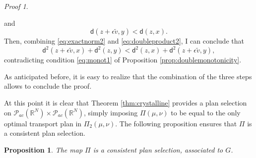 \documentclass[11pt,twoside,a4paper]{article}
\newcommand{\R}{\mathbb{R}}
\newcommand{\thmsymbol}{\( \square \)}
\newcommand{\di}{\mathsf d} %
\newcommand{\Prob}{\mathscr{P}}
\theoremstyle{theorem}
\newtheorem{prop}[theorem]{Proposition}
\theoremstyle{definition}
\theoremstyle{remark}
\theoremstyle{proof}
\newtheorem*{pro}{Proof}
\newenvironment{pr}{\begin{pro}%
 \renewcommand{\qedsymbol}{\thmsymbol}\pushQED{\qed}}%
 {\popQED\end{pro}}
\begin{document}
\begin{pr}
\begin{itemize}
   and
   \begin{equation}\label{eq:doubleproduct2}
       \di(z+\epsilon\tilde v, y)<\di (z,x).
   \end{equation}
   Then, combining \eqref{eq:exactnorm2} and \eqref{eq:doubleproduct2}, I can conclude that 
   \begin{equation*}
       \di^2 (z+\epsilon\tilde v, x) + \di^2 (z,y) < \di^2 (z,x) + \di^2(z+\epsilon\tilde v, y),
   \end{equation*}
    contradicting condition \eqref{eq:monot1} of Proposition \ref{prop:doublemonotonicity}.
\end{itemize}
As anticipated before, it is easy to realize that the combination of the three steps allows to conclude the proof.
  \end{pr}
  
At this point it is clear that Theorem \ref{thm:crystalline} provides a plan selection on $\Prob_{ac}(\R^N)\times \Prob_{ac}(\R^N)$, simply imposing $\Pi(\mu,\nu)$ to be equal to the only optimal transport plan in $\Pi_2(\mu,\nu)$. The following proposition ensures that $\Pi$ is a consistent plan selection. 
  
\begin{prop}
The map $\Pi$ is a consistent plan selection, associated to $G$.
\end{prop}
  
\end{document}
